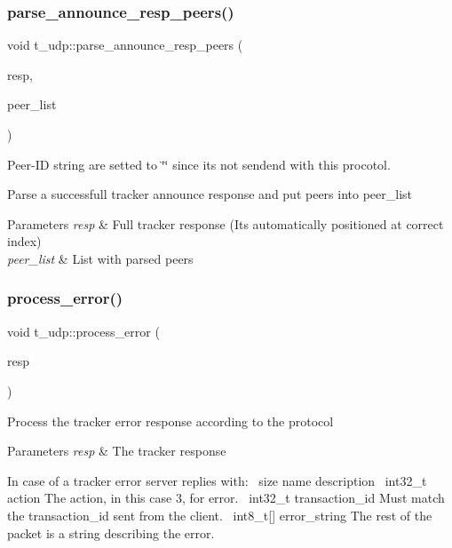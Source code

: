 \subsubsection{\texorpdfstring{parse\+\_\+announce\+\_\+resp\+\_\+peers()}{parse\_announce\_resp\_peers()}}
{\footnotesize\ttfamily void t\+\_\+udp\+::parse\+\_\+announce\+\_\+resp\+\_\+peers (\begin{DoxyParamCaption}\item[{std\+::vector$<$ uint8\+\_\+t $>$ \&}]{resp,  }\item[{pwp\+::\+Peer\+List}]{peer\+\_\+list }\end{DoxyParamCaption})}



Peer-\/\+ID string are setted to \char`\"{}\char`\"{} since it\textquotesingle{}s not sendend with this procotol. 

Parse a successfull tracker announce response and put peers into peer\+\_\+list


\begin{DoxyParams}{Parameters}
{\em resp} & Full tracker response (It\textquotesingle{}s automatically positioned at correct index) \\
\hline
{\em peer\+\_\+list} & List with parsed peers \\
\hline
\end{DoxyParams}
\mbox{\label{namespacet__udp_aab582ebbfac6fd929e811527e44384c1}} 
\subsubsection{\texorpdfstring{process\+\_\+error()}{process\_error()}}
{\footnotesize\ttfamily void t\+\_\+udp\+::process\+\_\+error (\begin{DoxyParamCaption}\item[{std\+::vector$<$ uint8\+\_\+t $>$ \&}]{resp }\end{DoxyParamCaption})}

Process the tracker error response according to the protocol


\begin{DoxyParams}{Parameters}
{\em resp} & The tracker response\\
\hline
\end{DoxyParams}
In case of a tracker error server replies with\+:~\newline
 size name description~\newline
 int32\+\_\+t action The action, in this case 3, for error.~\newline
 int32\+\_\+t transaction\+\_\+id Must match the transaction\+\_\+id sent from the client.~\newline
 int8\+\_\+t\mbox{[}\mbox{]} error\+\_\+string The rest of the packet is a string describing the error.~\newline
\mbox{\label{namespacet__udp_af26a254f05566a7066b6930ad998a656}} 
